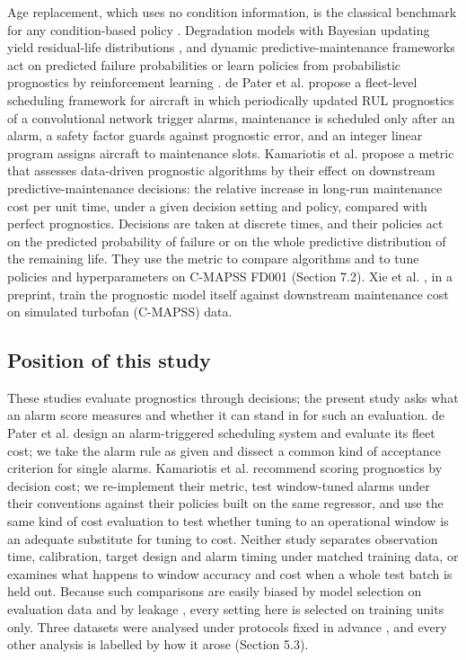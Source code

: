 \documentclass[a4paper,fleqn,doubleblind]{cas-dc}
\begin{document}
Age replacement, which uses no condition information, is the classical benchmark for any condition-based policy \cite{barlow1960,dejonge2020}. Degradation models with Bayesian updating yield residual-life distributions \cite{gebraeel2005}, and dynamic predictive-maintenance frameworks act on predicted failure probabilities \cite{nguyen2019,mitici2023} or learn policies from probabilistic prognostics by reinforcement learning \cite{lee2023}. de Pater et al. \cite{depater2022} propose a fleet-level scheduling framework for aircraft in which periodically updated RUL prognostics of a convolutional network trigger alarms, maintenance is scheduled only after an alarm, a safety factor guards against prognostic error, and an integer linear program assigns aircraft to maintenance slots. Kamariotis et al. \cite{kamariotis2024} propose a metric that assesses data-driven prognostic algorithms by their effect on downstream predictive-maintenance decisions: the relative increase in long-run maintenance cost per unit time, under a given decision setting and policy, compared with perfect prognostics. Decisions are taken at discrete times, and their policies act on the predicted probability of failure or on the whole predictive distribution of the remaining life. They use the metric to compare algorithms and to tune policies and hyperparameters on C-MAPSS FD001 (Section 7.2). Xie et al. \cite{xie2025}, in a preprint, train the prognostic model itself against downstream maintenance cost on simulated turbofan (C-MAPSS) data.

\subsection{Position of this study}

These studies evaluate prognostics through decisions; the present study asks what an alarm score measures and whether it can stand in for such an evaluation. de Pater et al. \cite{depater2022} design an alarm-triggered scheduling system and evaluate its fleet cost; we take the alarm rule as given and dissect a common kind of acceptance criterion for single alarms. Kamariotis et al. \cite{kamariotis2024} recommend scoring prognostics by decision cost; we re-implement their metric, test window-tuned alarms under their conventions against their policies built on the same regressor, and use the same kind of cost evaluation to test whether tuning to an operational window is an adequate substitute for tuning to cost. Neither study separates observation time, calibration, target design and alarm timing under matched training data, or examines what happens to window accuracy and cost when a whole test batch is held out. Because such comparisons are easily biased by model selection on evaluation data \cite{varma2006} and by leakage \cite{kapoor2023}, every setting here is selected on training units only. Three datasets were analysed under protocols fixed in advance \cite{nosek2018}, and every other analysis is labelled by how it arose (Section 5.3).
\end{document}
